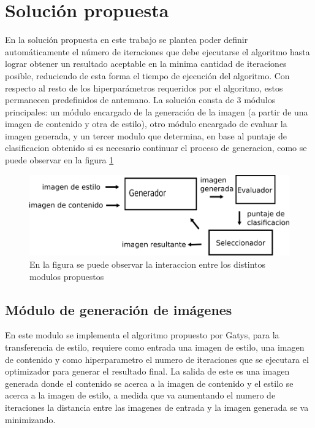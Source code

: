 \documentclass[a4paper,11pt,spanish]{book}
\begin{document}
  \section{Solución propuesta \label{sec:solucion}}
    En la solución propuesta en este trabajo se plantea poder definir automáticamente el número de iteraciones que debe ejecutarse el algoritmo hasta lograr obtener un resultado
    aceptable en la minima cantidad de iteraciones posible, reduciendo de esta forma el tiempo de ejecución del algoritmo.
    Con respecto al resto de los hiperparámetros  requeridos por el algoritmo, estos permanecen predefinidos de  antemano.
    La solución consta de 3 módulos principales: un módulo encargado de la generación de la imagen (a partir de una imagen de contenido y otra de estilo), otro módulo encargado de
    evaluar la imagen generada, y un tercer modulo que determina, en base al puntaje de clasificacion obtenido si es necesario continuar el proceso de generacion, como se puede
    observar en la figura \ref{fig:diagrama}

    \begin{figure}[h]
      \begin{center}
	\includegraphics[width=\linewidth]{./img/diagrama.png}
      \end{center}
      \caption{En la figura se puede observar la interaccion entre los distintos modulos propuestos}
      \label{fig:diagrama}
    \end{figure}

    \subsection{Módulo de generación de imágenes \label{sec:generador}}
      En este modulo se implementa el algoritmo propuesto por Gatys, para la transferencia de estilo, requiere como entrada una imagen de estilo,
      una imagen de contenido y como hiperparametro el numero de iteraciones que se ejecutara el optimizador para generar el resultado final.
      La salida de este es una imagen generada donde el contenido se acerca a la imagen de contenido  y el estilo se acerca a la imagen de estilo, a medida
      que va aumentando el numero de iteraciones la distancia entre las imagenes de entrada y la imagen generada se va minimizando.
    
\end{document}
